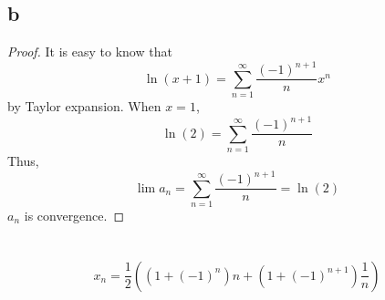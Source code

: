 \documentclass{article}
\begin{document}
        \subsection*{b}
        \begin{proof}
            It is easy to know that
            $$\ln(x+1)=\sum_{n=1}^\infty\frac{(-1)^{n+1}}{n}x^n$$
            by Taylor expansion. When $x=1$,
            $$\ln(2)=\sum_{n=1}^\infty \frac{(-1)^{n+1}}{n}$$
            Thus,
            $$\lim a_n=\sum_{n=1}^\infty \frac{(-1)^{n+1}}{n}=\ln(2)$$
            $a_n$ is convergence.
        \end{proof}
    \section{}
        \paragraph{
            $$x_n=\frac{1}{2}((1+(-1)^n)n+(1+(-1)^{n+1})\frac{1}{n})$$
        }
\end{document}
